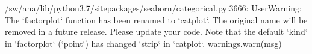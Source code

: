 \documentclass[letterpaper,10pt,english]{sphinxhowto}
\begin{document}
%
\begin{sphinxVerbatim}[commandchars=\\\{\}]
/sw/ana/lib/python3.7/site\PYGZhy{}packages/seaborn/categorical.py:3666: UserWarning: The {}`factorplot{}` function has been renamed to {}`catplot{}`. The original name will be removed in a future release. Please update your code. Note that the default {}`kind{}` in {}`factorplot{}` ({}`\PYGZsq{}point\PYGZsq{}{}`) has changed {}`\PYGZsq{}strip\PYGZsq{}{}` in {}`catplot{}`.
  warnings.warn(msg)
\end{sphinxVerbatim}




\renewcommand{\indexname}{索引}
\printindex
\end{document}
